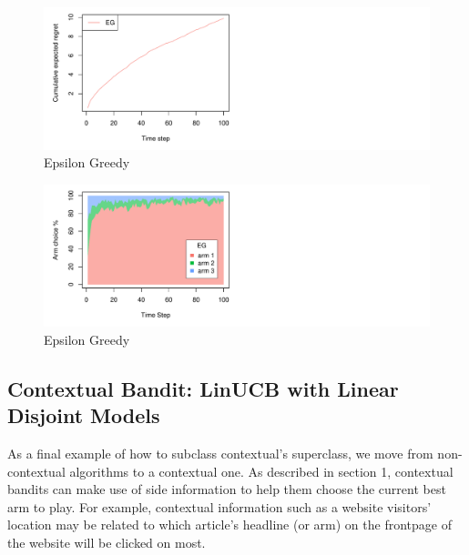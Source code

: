 \documentclass[nojss]{jss}\usepackage[]{graphicx}\usepackage[]{color}
\makeatletter
\def\maxwidth{ %
  \ifdim\Gin@nat@width>\linewidth
    \linewidth
  \else
    \Gin@nat@width
  \fi
}
\newenvironment{knitrout}{}{} %
\makeatother
\begin{document}
\begin{center}
\begin{knitrout}
\color{fgcolor}\begin{figure}[H]
\includegraphics[width=\maxwidth,]{fig/egpolicy-1} \caption[Epsilon Greedy]{Epsilon Greedy}\label{fig:egpolicy1}
\end{figure}

\begin{figure}[H]
\includegraphics[width=\maxwidth,]{fig/egpolicy-2} \caption[Epsilon Greedy]{Epsilon Greedy}\label{fig:egpolicy2}
\end{figure}


\end{knitrout}
\end{center}

\subsection{Contextual Bandit: LinUCB with Linear Disjoint Models}

As a final example of how to subclass contextual's  superclass, we move from non-contextual algorithms to a contextual one. As described in section 1, contextual bandits can make use of side information to help them choose the current best arm to play. For example, contextual information such as a website visitors' location may be related to which article's headline (or arm) on the frontpage of the website will be clicked on most.
\end{document}
